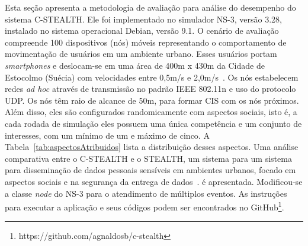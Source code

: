 \documentclass[12pt]{article}
\newcommand{\mn}[1]{\textcolor{red}{\bf [Michele]: #1}}
\begin{document}
Esta seção apresenta a metodologia de avaliação para análise do desempenho do sistema \mbox{C-STEALTH}. Ele foi implementado no simulador NS-3, versão 3.28, instalado no sistema operacional Debian, versão 9.1. O cenário de avaliação compreende 100 dispositivos (nós) móveis representando o comportamento de movimentação de usuários em um ambiente urbano. Esses usuários portam \textit{smartphones} e deslocam-se em uma área de 400m x 430m da Cidade de Estocolmo (Suécia) com velocidades entre 0,5m/s e 2,0m/s~\cite{helgason2014opportunistic}. Os nós estabelecem redes \textit{ad hoc} através de transmissão no padrão IEEE 802.11n e uso do protocolo UDP. Os nós têm raio de alcance de 50m, para
formar
CIS com os nós próximos. Além disso, eles são configurados randomicamente com aspectos sociais, isto é, a cada rodada de simulação eles possuem uma única competência e um conjunto de interesses, com um mínimo de um e máximo de cinco. A Tabela~\ref{tab:aspectosAtribuidos} lista a distribuição desses aspectos. Uma análise comparativa entre o C-STEALTH e o STEALTH, um sistema para um sistema para disseminação de dados pessoais sensíveis em ambientes urbanos, focado em aspectos sociais e na segurança da entrega de dados~\cite{batista2019sbseg}.
é apresentada. %
Modificou-se a classe \textit{node} do NS-3 para o atendimento de múltiplos eventos. As instruções para executar a aplicação e seus códigos podem ser encontrados no GitHub\footnote{https://github.com/agnaldosb/c-stealth}.


\begin{comment}

\begin{table}[H]
\setlength{\extrarowheight}{2.0pt}
\relsize{-2.0}
\centering
\caption{Distribuição dos aspectos sociais atribuídos aos nós}
\vspace{-0.2cm}
\label{tab:aspectosAtribuidos}
\begin{tabular}{l|cccc|ccccc}
\hlineB{2}
\multirow{2}{*}{\textbf{Aspectos Sociais}} & \multicolumn{4}{c|}{\textbf{Competências}} & \multicolumn{5}{c}{\textbf{Interesses}} \\ \cline{2-10}
&Médico&Enfermeiro&Cuidador&Outras&Saúde&Turismo&Música&Filmes&Livros \\ \hline
\textbf{\# de Nós} &10&15&20&55&20&30&45&60&15 \\ 
\hlineB{2}
\end{tabular}
\end{table}

\end{comment}
\end{document}
